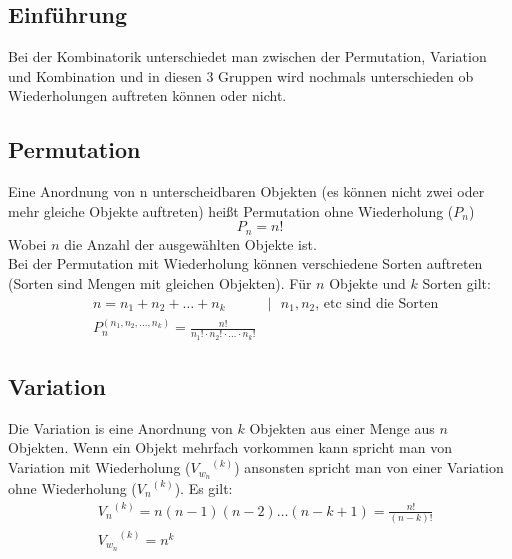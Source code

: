 \documentclass[a4paper]{scrartcl}
\begin{document}
        \subsection{Einführung}
            Bei der Kombinatorik unterschiedet man zwischen der Permutation, Variation und Kombination und in diesen 3 Gruppen wird nochmals unterschieden ob Wiederholungen auftreten 
            können oder nicht. 
        \subsection{Permutation}
            Eine Anordnung von n unterscheidbaren Objekten (es können nicht zwei oder mehr gleiche Objekte auftreten) heißt Permutation ohne Wiederholung (\(P_n\))
            \begin{equation}
                P_n = n!
            \end{equation} 
            Wobei \(n\) die Anzahl der ausgewählten Objekte ist. \\
            Bei der Permutation mit Wiederholung können verschiedene Sorten auftreten (Sorten sind Mengen mit gleichen Objekten). Für \(n\) Objekte und \(k\) Sorten gilt:
            \begin{equation*}
                \begin{aligned}
                    & n = n_1 + n_2 + \ldots + n_k & | \text{ \(n_1,n_2\), etc sind die Sorten} \\
                    & P_n^{(n_1,n_2, \ldots ,n_k)} = \frac{n!}{n_1! \cdot n_2! \cdot ... \cdot n_k!}
                \end{aligned}
            \end{equation*} 
        \subsection{Variation}
            Die Variation is eine Anordnung von \(k\) Objekten aus einer Menge aus \(n\) Objekten. Wenn ein Objekt mehrfach vorkommen kann spricht man 
            von Variation mit Wiederholung (\({V_{w_n}}^{(k)}\)) ansonsten spricht man von einer Variation ohne Wiederholung (\({V_{n}}^{(k)}\)). Es gilt:
            \begin{equation*}
                \begin{aligned}
                    & {V_{n}}^{(k)} = n(n-1)(n-2) \ldots (n-k+1) = \frac{n!}{(n-k)!} \\
                    & {V_{w_n}}^{(k)} = n^k 
                \end{aligned}
            \end{equation*}
\end{document}
